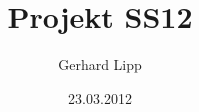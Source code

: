 \documentclass[hyperref=dvipdfmx]{beamer}
\title{Projekt SS12}
\author{Gerhard Lipp}
\date{23.03.2012}
\begin{document}
\begin{frame}
    \titlepage
\end{frame}


\end{document}
